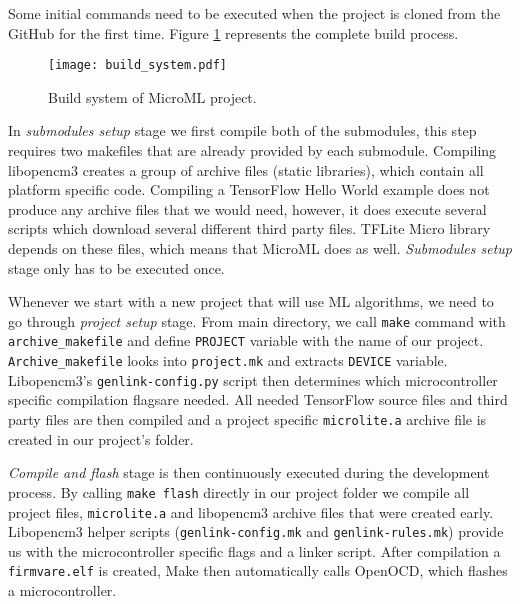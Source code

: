 Some initial commands need to be executed when the project is cloned from the GitHub for the first time. 
Figure \ref{build_system} represents the complete build process.

\begin{figure}[ht]
        \centering
        \texttt{[image: build\_system.pdf]} 
        \caption{ Build system of MicroML project.} 
        \label{build_system}
\end{figure}

In \textit{submodules setup} stage we first compile both of the submodules, this step requires two makefiles that are already provided by each submodule.
Compiling libopencm3 creates a group of archive files (static libraries), which contain all platform specific code.
Compiling a TensorFlow Hello World example does not produce any archive files that we would need, however, it does execute several scripts which download several different third party files.
TFLite Micro library depends on these files, which means that MicroML does as well.
\textit{Submodules setup} stage only has to be executed once.

Whenever we start with a new project that will use ML algorithms, we need to go through \textit{project setup} stage.
From main directory, we call \verb|make| command with \verb|archive_makefile| and define \verb|PROJECT| variable with the name of our project.
\verb|Archive_makefile| looks into \verb|project.mk| and extracts \verb|DEVICE| variable.
Libopencm3's \verb|genlink-config.py| script then determines which microcontroller specific compilation flags\footnotemark are needed. 
All needed TensorFlow source files and third party files are then compiled and a project specific \verb|microlite.a| archive file is created in our project's folder.

\textit{Compile and flash} stage is then continuously executed during the development process.
By calling \verb|make flash| directly in our project folder we compile all project files, \verb|microlite.a| and libopencm3 archive files that were created early.
Libopencm3 helper scripts (\verb|genlink-config.mk| and \verb|genlink-rules.mk|) provide us with the microcontroller specific flags and a linker script.
After compilation a \verb|firmvare.elf| is created, Make then automatically calls OpenOCD, which flashes a microcontroller.


